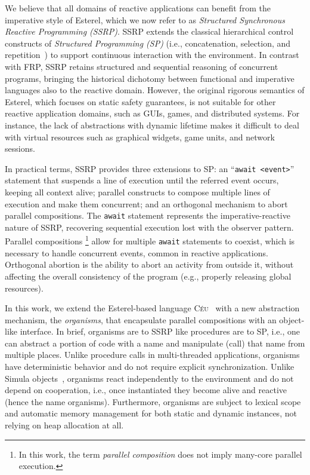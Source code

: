 \documentclass[preprint]{sigplanconf}
\newcommand{\CEU}{\textsc{C\'{e}u}\xspace}
\newcommand{\code}[1] {{\small{\texttt{#1}}}}
\newcommand{\1}{\;}
\newcommand{\2}{\;\;}
\newcommand{\3}{\;\;\;}
\newcommand{\5}{\;\;\;\;\;}
\begin{document}
We believe that all domains of reactive applications can benefit from the 
imperative style of Esterel, which we now refer to as \emph{Structured 
Synchronous Reactive Programming (SSRP)}.
%
SSRP extends the classical hierarchical control constructs of \emph{Structured 
Programming (SP)} (i.e., concatenation, selection, and 
repetition~\cite{dij.notes}) to support continuous interaction with the 
environment.
%
In contrast with FRP, SSRP retains structured and sequential reasoning of 
concurrent programs, bringing the historical dichotomy between functional and 
imperative languages also to the reactive domain.
%
However, the original rigorous semantics of Esterel, which focuses on static 
safety guarantees, is not suitable for other reactive application domains, such 
as GUIs, games, and distributed systems.
%
For instance, the lack of abstractions with dynamic lifetime makes it difficult 
to deal with virtual resources such as graphical widgets, game units, and 
network sessions.

In practical terms, SSRP provides three extensions to SP:
an ``\code{await <event>}'' statement that suspends a line of execution until 
the referred event occurs, keeping all context alive;
parallel constructs to compose multiple lines of execution and make them 
concurrent;
and an orthogonal mechanism to abort parallel compositions.
%
The \code{await} statement represents the imperative-reactive nature of SSRP, 
recovering sequential execution lost with the observer pattern.
%
Parallel compositions%
\footnote{
In this work, the term \emph{parallel composition} does not imply many-core 
parallel execution.
}
allow for multiple \code{await} statements to coexist, which is necessary to 
handle concurrent events, common in reactive applications.
%
Orthogonal abortion is the ability to abort an activity from outside it, 
without affecting the overall consistency of the program (e.g., properly 
releasing global resources).

In this work, we extend the Esterel-based language \CEU~\cite{ceu.sensys13} 
with a new abstraction mechanism, the \emph{organisms}, that encapsulate 
parallel compositions with an object-like interface.
%
In brief, organisms are to SSRP like procedures are to SP, i.e., one can 
abstract a portion of code with a name and manipulate (call) that name from 
multiple places.
%
Unlike procedure calls in multi-threaded applications, organisms have 
deterministic behavior and do not require explicit synchronization.
%
Unlike Simula objects~\cite{simula}, organisms react independently to the 
environment and do not depend on cooperation, i.e., once instantiated they 
become alive and reactive (hence the name organisms).
%
%
Furthermore, organisms are subject to lexical scope and automatic memory 
management for both static and dynamic instances, not relying on heap 
allocation at all.
%
\end{document}
